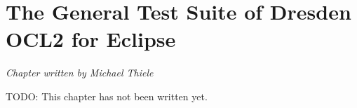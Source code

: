 \chapter{The General Test Suite of Dresden OCL2 for Eclipse}
\label{chapter:generalTestSuite}

\begin{flushright}
\textit{Chapter written by Michael Thiele}
\end{flushright}

TODO: This chapter has not been written yet.

